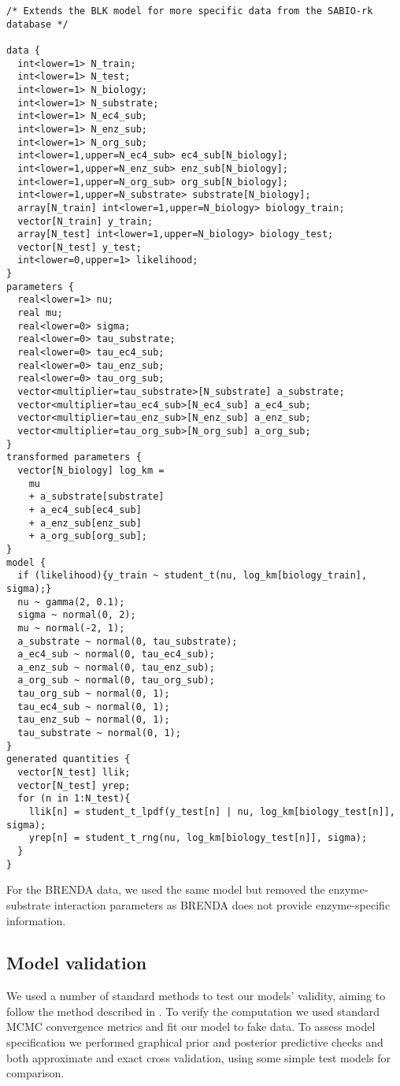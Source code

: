 \documentclass[11pt]{article}
\begin{document}
\begin{verbatim}
/* Extends the BLK model for more specific data from the SABIO-rk database */

data {
  int<lower=1> N_train;
  int<lower=1> N_test;
  int<lower=1> N_biology;
  int<lower=1> N_substrate;
  int<lower=1> N_ec4_sub;
  int<lower=1> N_enz_sub;
  int<lower=1> N_org_sub;
  int<lower=1,upper=N_ec4_sub> ec4_sub[N_biology];
  int<lower=1,upper=N_enz_sub> enz_sub[N_biology];
  int<lower=1,upper=N_org_sub> org_sub[N_biology];
  int<lower=1,upper=N_substrate> substrate[N_biology];
  array[N_train] int<lower=1,upper=N_biology> biology_train;
  vector[N_train] y_train;
  array[N_test] int<lower=1,upper=N_biology> biology_test;
  vector[N_test] y_test;
  int<lower=0,upper=1> likelihood;
}
parameters {
  real<lower=1> nu;
  real mu;
  real<lower=0> sigma;
  real<lower=0> tau_substrate;
  real<lower=0> tau_ec4_sub;
  real<lower=0> tau_enz_sub;
  real<lower=0> tau_org_sub;
  vector<multiplier=tau_substrate>[N_substrate] a_substrate;
  vector<multiplier=tau_ec4_sub>[N_ec4_sub] a_ec4_sub;
  vector<multiplier=tau_enz_sub>[N_enz_sub] a_enz_sub;
  vector<multiplier=tau_org_sub>[N_org_sub] a_org_sub;
}
transformed parameters {
  vector[N_biology] log_km =
    mu
    + a_substrate[substrate]
    + a_ec4_sub[ec4_sub]
    + a_enz_sub[enz_sub]
    + a_org_sub[org_sub];
}
model {
  if (likelihood){y_train ~ student_t(nu, log_km[biology_train], sigma);}
  nu ~ gamma(2, 0.1);
  sigma ~ normal(0, 2);
  mu ~ normal(-2, 1);
  a_substrate ~ normal(0, tau_substrate);
  a_ec4_sub ~ normal(0, tau_ec4_sub);
  a_enz_sub ~ normal(0, tau_enz_sub);
  a_org_sub ~ normal(0, tau_org_sub);
  tau_org_sub ~ normal(0, 1);
  tau_ec4_sub ~ normal(0, 1);
  tau_enz_sub ~ normal(0, 1);
  tau_substrate ~ normal(0, 1);
}
generated quantities {
  vector[N_test] llik;
  vector[N_test] yrep;
  for (n in 1:N_test){
    llik[n] = student_t_lpdf(y_test[n] | nu, log_km[biology_test[n]], sigma);
    yrep[n] = student_t_rng(nu, log_km[biology_test[n]], sigma);
  }
}
\end{verbatim}

For the BRENDA data, we used the same model but removed the enzyme-substrate
interaction parameters as BRENDA does not provide enzyme-specific information.

\subsection{Model validation}
\label{sec:org9a4e03e}
We used a number of standard methods to test our models' validity, aiming to
follow the method described in . To verify the
computation we used standard MCMC convergence metrics and fit our model to fake
data. To assess model specification we performed graphical prior and posterior
predictive checks and both approximate and exact cross validation, using some
simple test models for comparison.
\end{document}
